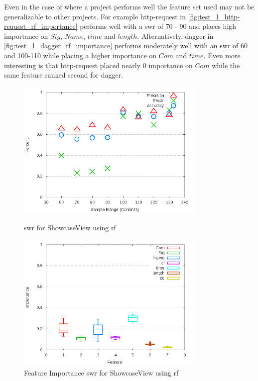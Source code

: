 Even in the case of where a project performs well the feature set used may not be generalizable to other projects. For example http-request in \autoref{fig:test_1_http-request_rf_importance} performs well with a \gls{swr} of 70 - 90 and places high importance on $Sig$, $Name$, $time$ and $length$. Alternatively, dagger in \autoref{fig:test_1_dagger_rf_importance} performs moderately well with an \gls{swr} of 60 and 100-110 while placing a higher importance on $Com$ and $time$. Even more interesting is that http-request placed nearly 0 importance on $Com$ while the same feature ranked second for dagger.

\begin{figure}[!ht]
    \centering
        \includegraphics[width=0.8\textwidth]{images/rf/test_1/ShowcaseView_sample_range}
        \caption{\gls{swr} for ShowcaseView using \gls{rf}}
        \label{fig:test_1_ShowcaseView_rf}

    \includegraphics[width=0.8\textwidth]{images/rf/test_1/ShowcaseView_importance}
        \caption{Feature Importance \gls{swr} for ShowcaseView using \gls{rf}}
        \label{fig:test_1_ShowcaseView_rf_importance}
\end{figure}

